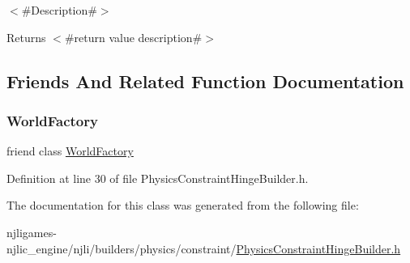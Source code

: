 $<$\#\+Description\#$>$

\begin{DoxyReturn}{Returns}
$<$\#return value description\#$>$ 
\end{DoxyReturn}


\subsection{Friends And Related Function Documentation}
\mbox{\label{classnjli_1_1_physics_constraint_hinge_builder_acb96ebb09abe8f2a37a915a842babfac}} 
\subsubsection{\texorpdfstring{World\+Factory}{WorldFactory}}
{\footnotesize\ttfamily friend class \mbox{\hyperlink{classnjli_1_1_world_factory}{World\+Factory}}\hspace{0.3cm}{\ttfamily [friend]}}



Definition at line 30 of file Physics\+Constraint\+Hinge\+Builder.\+h.



The documentation for this class was generated from the following file\+:\begin{DoxyCompactItemize}
\item 
njligames-\/njlic\+\_\+engine/njli/builders/physics/constraint/\mbox{\hyperlink{_physics_constraint_hinge_builder_8h}{Physics\+Constraint\+Hinge\+Builder.\+h}}\end{DoxyCompactItemize}
